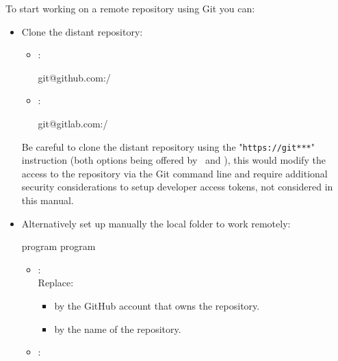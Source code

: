 To start working on a remote repository using Git you can:
\begin{itemize}
\item Clone the distant repository:
\begin{itemize}
\item \github:
{\footnotesize{
\begin{scriptii}
  git@github.com:/
\end{scriptii}
}}
\item \gitlab:
{\footnotesize{
\begin{scriptii}
  git@gitlab.com:/
\end{scriptii}
}}
\end{itemize}
\noindent Be careful  to clone the distant repository using the "\texttt{https://git***}" instruction 
(both options being offered by \github\ and \gitlab), 
this would modify the access to the repository via the Git command line and require additional security considerations to setup 
developer access tokens, not considered in this manual. \\[0.25cm]
\item Alternatively set up manually the local folder to work remotely:
{\footnotesize{
\begin{scripti}
\fprompt{~}  program
\fprompt{~}  program
 
\end{scripti}
}}
\begin{itemize}
\item \github:
{}
\\[-0.75cm]
\noindent Replace:
\begin{itemize}
\item {}\quad by the GitHub account that owns the repository.
\item {}\quad by the name of the repository. \\
\end{itemize}
\item \gitlab:
{}
\end{itemize}
\end{itemize}
